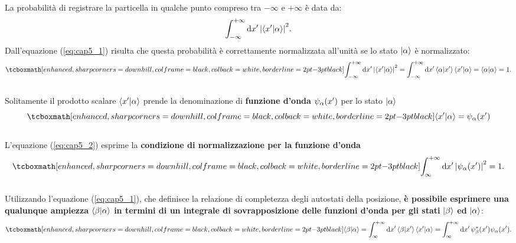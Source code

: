 \documentclass[a4paper,12pt,oneside]{book}
\begin{document}
La probabilità di registrare la particella in qualche punto compreso tra $-\infty$ e $+\infty$ è data da:
	\begin{equation}
		\int_{-\infty}^{+\infty}\dd{x'}\abs{\braket{x'}{\alpha}}^2.
	\end{equation}
Dall'equazione (\ref{eq:cap5_1}) risulta che questa probabilità è correttamente normalizzata all'unità se lo stato $\ket{\alpha}$ è normalizzato:
	\begin{equation}
	  \label{eq:cap5_2}
		\tcboxmath[enhanced, sharp corners=downhill, colframe=black, colback=white, borderline={2pt}{-3pt}{black}]{
			\int_{-\infty}^{+\infty}\dd{x'}\abs{\braket{x'}{\alpha}}^2 = \int_{-\infty}^{+\infty}\dd{x'}\braket{\alpha}{x'}\braket{x'}{\alpha}=\braket{\alpha}{\alpha} = 1 .
			}
	\end{equation}\\
	
Solitamente il prodotto scalare $\braket{x'}{\alpha}$ prende la denominazione di \textbf{funzione d'onda} $\psi_{\alpha}\qty(x')$ per lo stato $\ket{\alpha}$
	\begin{equation}
		\tcboxmath[enhanced, sharp corners=downhill, colframe=black, colback=white, borderline={2pt}{-3pt}{black}]{
			\braket{x'}{\alpha} = \psi_{\alpha}\qty(x')
			}
	\end{equation}\\
	
L'equazione (\ref{eq:cap5_2}) esprime la \textbf{condizione di normalizzazione per la funzione d'onda}
	\begin{equation}
		\tcboxmath[enhanced, sharp corners=downhill, colframe=black, colback=white, borderline={2pt}{-3pt}{black}]{
				\int_{\infty}^{+\infty}\dd{x'}\abs{\psi_{\alpha}\qty(x')}^2=1 .
				}
	\end{equation}\\
	
Utilizzando l'equazione (\ref{eq:cap5_1}), che definisce la relazione di completezza degli autostati della posizione, \textbf{è possibile esprimere una qualunque ampiezza} $\braket{\beta}{\alpha}$ \textbf{in termini di un integrale di sovrapposizione delle funzioni d'onda per gli stati} $\ket{\beta}$ \textbf{ed} $\ket{\alpha}$:
	\begin{equation}
		\tcboxmath[enhanced, sharp corners=downhill, colframe=black, colback=white, borderline={2pt}{-3pt}{black}]{
			\braket{\beta}{\alpha}=\int_{\infty}^{+\infty}\dd{x'}\braket{\beta}{x'}\braket{x'}{\alpha} = \int_{\infty}^{+\infty}\dd{x'} \psi^*_{\beta}\qty(x')\psi_{\alpha}\qty(x') .
			}
	\end{equation}\\
	
\end{document}
